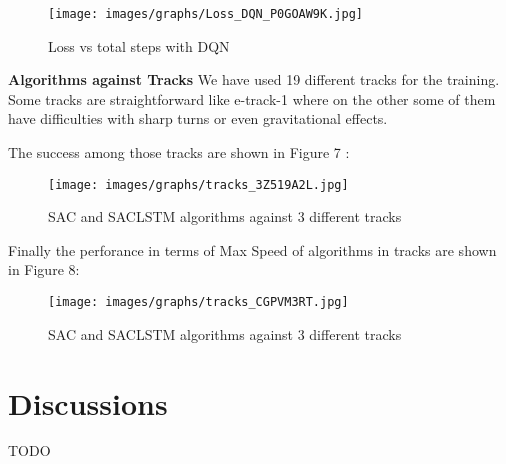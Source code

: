 \documentclass[conference]{IEEEtran}
\begin{document}
\begin{figure}[hbt!]
  \texttt{[image: images/graphs/Loss\_DQN\_P0GOAW9K.jpg]}
  \caption{Loss vs total steps with DQN }
\end{figure}


\textbf{Algorithms against Tracks}
We have used 19 different tracks for the training. Some tracks are straightforward like e-track-1 where on the other some of them have difficulties with sharp turns or even gravitational effects.\

The success among those tracks are shown in Figure 7 :

\begin{figure}[hbt!]
  \texttt{[image: images/graphs/tracks\_3Z519A2L.jpg]}
  \caption{SAC and SACLSTM algorithms against 3 different tracks }
\end{figure}

Finally the perforance in terms of Max Speed of algorithms in tracks are shown in Figure 8:\


\begin{figure}[hbt!]
  \texttt{[image: images/graphs/tracks\_CGPVM3RT.jpg]}
  \caption{SAC and SACLSTM algorithms against 3 different tracks }
\end{figure}





\section{Discussions}
TODO











%
%
%






\end{document}
